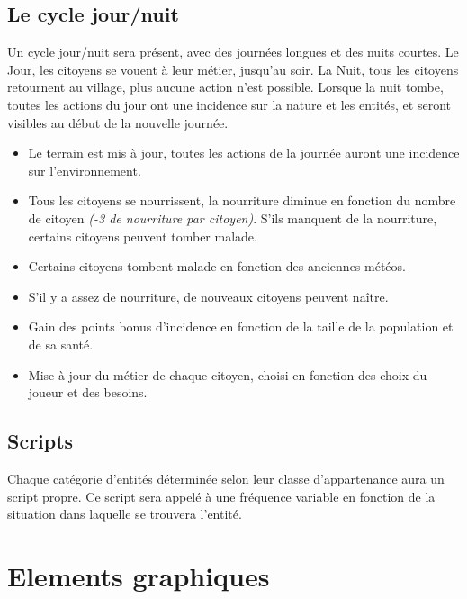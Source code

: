 \documentclass[a4paper]{article}
\newcommand{\alinea}{\hspace*{0.5cm}}
\begin{document}
	\subsection{Le cycle jour/nuit}
	  \label{Cycle}
	  \alinea Un cycle jour/nuit sera présent, avec des journées longues et des nuits courtes. Le Jour, les citoyens se vouent à leur métier, jusqu'au soir. La Nuit, tous les citoyens retournent au village, plus aucune action n'est possible. Lorsque la nuit tombe, toutes les actions du jour ont une incidence sur la nature et les entités, et seront visibles au début de la nouvelle journée.
	  \begin{itemize} \small
		\item Le terrain est mis à jour, toutes les actions de la journée auront une incidence sur l'environnement.
		\item Tous les citoyens se nourrissent, la nourriture diminue en fonction du nombre de citoyen \textit{(-3 de nourriture par citoyen)}. S'ils manquent de la nourriture, certains citoyens peuvent tomber malade.
		\item Certains citoyens tombent malade en fonction des anciennes météos.
		\item S'il y a assez de nourriture, de nouveaux citoyens peuvent naître.
		\item Gain des points bonus d'incidence en fonction de la taille de la population et de sa santé.
		\item Mise à jour du métier de chaque citoyen, choisi en fonction des choix du joueur et des besoins.
	  \end{itemize} \normalsize

      \subsection{Scripts}
\alinea Chaque catégorie d'entités déterminée selon leur classe d'appartenance aura un script propre. Ce script sera appelé à une fréquence variable en fonction de la situation dans laquelle se trouvera l'entité.
      
    \section{Elements graphiques}
\end{document}
